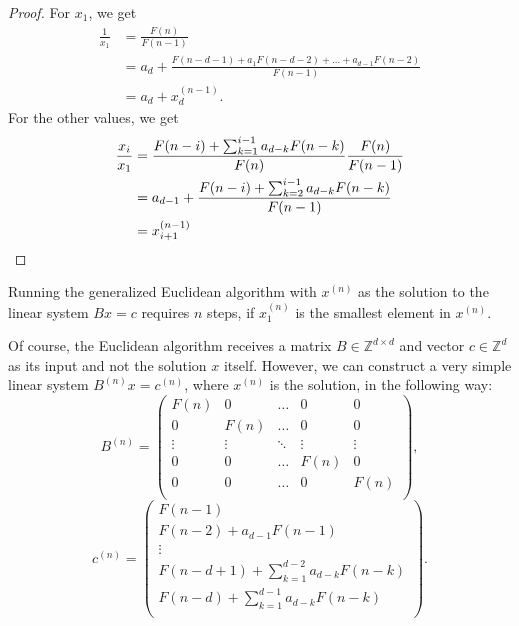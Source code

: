 \documentclass[english,version-2020-11]{uzl-thesis}
\newcommand\Z{{\mathbb Z}}
\begin{document}
\begin{proof}
  For $x_1$, we get
  \[
    \begin{aligned}
      \frac{1}{x_1}
      & = \frac{F(n)}{F(n - 1)} \\
      & = a_d + \frac{F(n - d - 1) + a_1 F(n - d - 2) + \dots + a_{d-1} F(n - 2)}{F(n - 1)} \\
      & = a_d + x^{(n-1)}_d.
    \end{aligned}
  \]
  For the other values, we get
  \begin{align*}
    \frac{x_i}{x_1}
    & = \frac{F(n - i) + \sum_{k=1}^{i-1} a_{d-k} F(n - k)}{F(n)} \frac{F(n)}{F(n - 1)} \\
    & = a_{d-1} + \frac{F(n - i) + \sum_{k=2}^{i-1} a_{d-k} F(n - k)}{F(n-1)} \\
    & = x^{(n-1)}_{i+1} \qedhere
  \end{align*}
\end{proof}

\begin{corollary}
  Running the generalized Euclidean algorithm with $x^{(n)}$ as the solution to
  the linear system $B x = c$ requires $n$ steps, if $x^{(n)}_1$ is the
  smallest element in $x^{(n)}$.
\end{corollary}

Of course, the Euclidean algorithm receives a matrix $B \in \Z^{d \times d}$
and vector $c \in \Z^d$ as its input and not the solution $x$ itself.
However, we can construct a very simple linear system $B^{(n)} x = c^{(n)}$,
where $x^{(n)}$ is the solution, in the following way:
\[
  B^{(n)} =
  \begin{pmatrix}
    F(n) & 0 & \dots & 0 & 0 \\
    0 & F(n) & \dots & 0 & 0 \\
    \vdots & \vdots & \ddots & \vdots & \vdots \\
    0 & 0 & \dots & F(n) & 0 \\
    0 & 0 & \dots & 0 & F(n) \\
  \end{pmatrix},
\]
\[
  c^{(n)} =
  \begin{pmatrix}
    F(n - 1) \\
    F(n - 2) + a_{d-1} F(n - 1) \\
    \vdots \\
    F(n - d + 1) + \sum_{k=1}^{d-2} a_{d-k} F(n - k) \\
    F(n - d) + \sum_{k=1}^{d-1} a_{d-k} F(n - k) \\
  \end{pmatrix}.
\]
\end{document}
